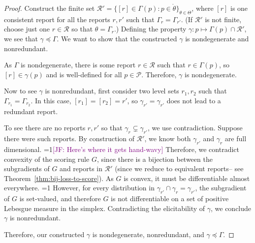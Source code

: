 \documentclass[12pt]{article}
\newcommand{\Comments}{1}
\newcommand{\mynote}[2]{\ifnum\Comments=1\textcolor{#1}{#2}\fi}
\newcommand{\mytodo}[2]{\ifnum\Comments=1%
  \todo[linecolor=#1!80!black,backgroundcolor=#1,bordercolor=#1!80!black]{#2}\fi}
\newcommand{\jessie}[1]{\mynote{purple}{[JF: #1]}}
\newcommand{\jessiet}[1]{\mytodo{purple!20!white}{JF: #1}}
\renewcommand{\P}{\mathcal{P}}
\newcommand{\R}{\mathcal{R}}
\newcommand{\inter}[1]{\mathring{#1}}%
\begin{document}
\begin{proof}
	Construct the finite set $\R' = \{[r] \in \Gamma(p) : p \in \inter{\theta} \}_{\theta \in \Theta}$, where $[r]$ is one consistent report for all the reports $r, r'$ such that $\Gamma_r = \Gamma_{r'}$. 
	(If $\R'$ is not finite, choose just one $r \in \R$ so that $\theta = \Gamma_r$.)
	Defining the property $\gamma : p \mapsto \Gamma(p) \cap \R'$, we see that $\gamma \preceq \Gamma$.
	We want to show that the constructed $\gamma$ is nondegenerate and nonredundant.

	As $\Gamma$ is nondegenerate, there is some report $r \in \R$ such that $r \in \Gamma(p)$, so $[r] \in \gamma(p)$ and is well-defined for all $p \in \P$.
	Therefore, $\gamma$ is nondegenerate.

	Now to see $\gamma$ is nonredundant, first consider two level sets $r_1, r_2$ such that $\Gamma_{r_1} = \Gamma_{r_2}$.
	In this case, $[r_1] = [r_2] = r'$, so $\gamma_{r'} = \gamma_{r'}$ does not lead to a redundant report.
	
	To see there are no reports $r, r'$ so that $\gamma_{r} \subsetneq \gamma_{r'}$, we use contradiction.
	Suppose there were such reports.
	By construction of $\R'$, we know both $\gamma_{r'}$ and $\gamma_r$ are full dimensional.
	\jessie{Here's where it gets hand-wavy}
	Therefore, we contradict convexity of the scoring rule $G$, since there is a bijection between the subgradients of $G$ and reports in $\R'$ (since we reduce to equivalent reports-- see Theorem~\ref{thm:bij-loss-to-score}).
	As $G$ is convex, it must be differentiable almost everywhere. 
	\jessiet{See Conjecture~\ref{conj:cvx-sets-nonempty-int-iff-pos-measure}}
	However, for every distribution in $\gamma_{r'} \cap \gamma_{r} = \gamma_{r'}$, the subgradient of $G$ is set-valued, and therefore $G$ is not differentiable on a set of positive Lebesgue measure in the simplex. 
	Contradicting the elicitability of $\gamma$, we conclude $\gamma$ is nonredundant. 

	
	Therefore, our constructed $\gamma$ is nondegenerate, nonredundant, and $\gamma \preceq \Gamma$.
\end{proof}
\end{document}
